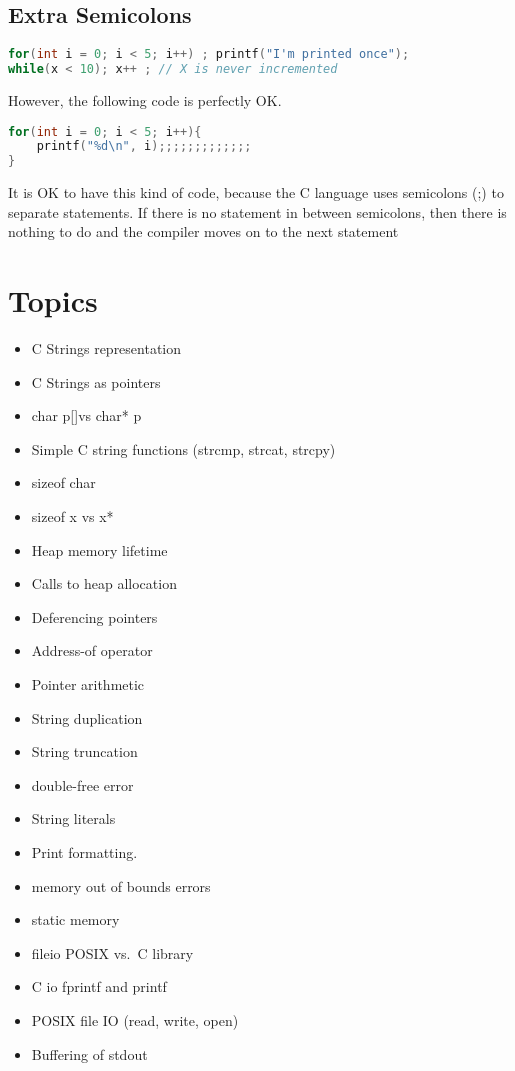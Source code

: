 \subsection{Extra Semicolons}\label{extra-semicolons}

\begin{lstlisting}[language=C]
for(int i = 0; i < 5; i++) ; printf("I'm printed once");
while(x < 10); x++ ; // X is never incremented
\end{lstlisting}

However, the following code is perfectly OK.

\begin{lstlisting}[language=C]
for(int i = 0; i < 5; i++){
    printf("%d\n", i);;;;;;;;;;;;;
}
\end{lstlisting}

It is OK to have this kind of code, because the C language uses
semicolons (;) to separate statements. If there is no statement in
between semicolons, then there is nothing to do and the compiler moves
on to the next statement

\section{Topics}

\begin{itemize}
	\tightlist
	\item
	      C Strings representation
	\item
	      C Strings as pointers
	\item
	      char p{[}{]}vs char* p
	\item
	      Simple C string functions (strcmp, strcat, strcpy)
	\item
	      sizeof char
	\item
	      sizeof x vs x*
	\item
	      Heap memory lifetime
	\item
	      Calls to heap allocation
	\item
	      Deferencing pointers
	\item
	      Address-of operator
	\item
	      Pointer arithmetic
	\item
	      String duplication
	\item
	      String truncation
	\item
	      double-free error
	\item
	      String literals
	\item
	      Print formatting.
	\item
	      memory out of bounds errors
	\item
	      static memory
	\item
	      fileio POSIX vs.~C library
	\item
	      C io fprintf and printf
	\item
	      POSIX file IO (read, write, open)
	\item
	      Buffering of stdout
\end{itemize}

